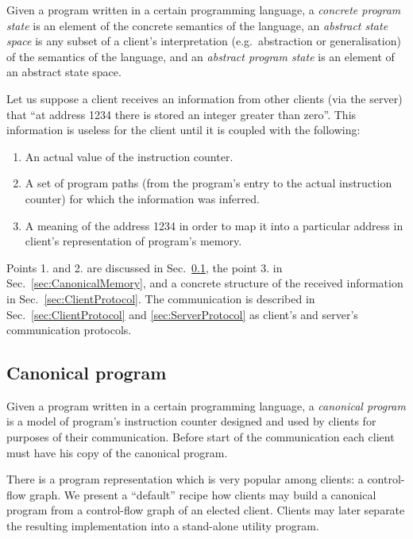 \documentclass[envcountsame]{llncs}
\begin{document}
Given a program written in a certain programming language, a \emph{concrete
program state} is  an element of the concrete semantics of the language, an
\emph{abstract state space} is any subset of a client's interpretation
(e.g.~abstraction or generalisation) of the semantics of the language, and 
an \emph{abstract program state} is an element of an abstract state space.

Let us suppose a client receives an information from other clients (via the
server) that ``at address 1234 there is stored an integer greater than zero''. This
information is useless for the client until it is coupled with the following:
\begin{enumerate}
\item An actual value of the instruction counter. \item A set of program paths (from the program's entry to the actual instruction
counter) for which the information was inferred. \item A meaning of the address 1234 in order to map it into a particular address
in client's representation of program's memory.
\end{enumerate}

Points 1. and 2. are discussed in Sec.~\ref{sec:CanonicalProgram}, the point 3.
in Sec.~\ref{sec:CanonicalMemory}, and a concrete structure of the received
information in Sec.~\ref{sec:ClientProtocol}. The communication is described in
Sec.~\ref{sec:ClientProtocol} and \ref{sec:ServerProtocol} as client's and
server's communication protocols.


\subsection{Canonical program}
\label{sec:CanonicalProgram}

Given a program written in a certain programming language, a \emph{canonical
program} is a model of program's instruction counter designed and used by
clients for purposes of their communication. Before start of the communication
each client must have his copy of the canonical program.

There is a program representation which is very popular among clients: a
control-flow graph. We present a ``default'' recipe how clients may build a
canonical program from a control-flow graph of an elected client. Clients may
later separate the resulting implementation into a stand-alone utility program.
\end{document}
